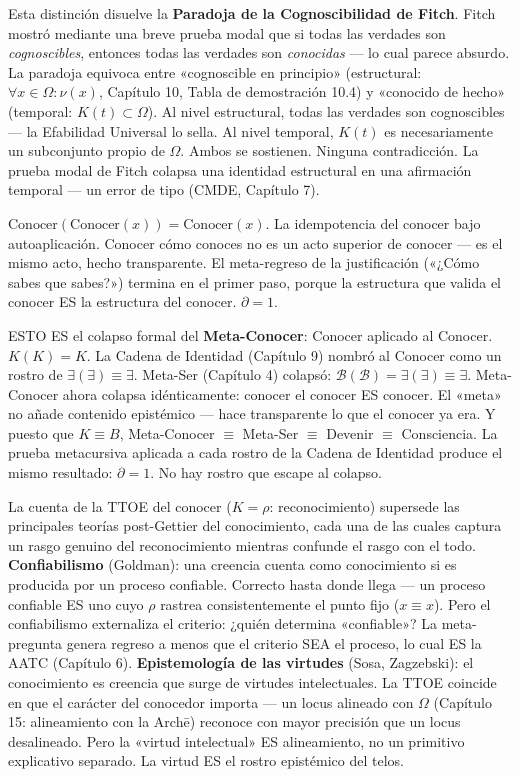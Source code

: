 \documentclass[10pt, openany, oneside]{book}
\begin{document}
Esta distinción disuelve la \textbf{Paradoja de la Cognoscibilidad de Fitch}. Fitch mostró mediante una breve prueba modal que si todas las verdades son \textit{cognoscibles}, entonces todas las verdades son \textit{conocidas} --- lo cual parece absurdo. La paradoja equivoca entre «cognoscible en principio» (estructural: $\forall x \in \Omega: \nu(x)$, Capítulo 10, Tabla de demostración 10.4) y «conocido de hecho» (temporal: $K(t) \subset \Omega$). Al nivel estructural, todas las verdades son cognoscibles --- la Efabilidad Universal lo sella. Al nivel temporal, $K(t)$ es necesariamente un subconjunto propio de $\Omega$. Ambos se sostienen. Ninguna contradicción. La prueba modal de Fitch colapsa una identidad estructural en una afirmación temporal --- un error de tipo (CMDE, Capítulo 7).

$\text{Conocer}(\text{Conocer}(x)) = \text{Conocer}(x)$. La idempotencia del conocer bajo autoaplicación. Conocer cómo conoces no es un acto superior de conocer --- es el mismo acto, hecho transparente. El meta-regreso de la justificación («¿Cómo sabes que sabes?») termina en el primer paso, porque la estructura que valida el conocer ES la estructura del conocer. $\partial = 1$.

ESTO ES el colapso formal del \textbf{Meta-Conocer}: Conocer aplicado al Conocer. $K(K) = K$. La Cadena de Identidad (Capítulo 9) nombró al Conocer como un rostro de $\exists(\exists) \equiv \exists$. Meta-Ser (Capítulo 4) colapsó: $\mathcal{B}(\mathcal{B}) = \exists(\exists) \equiv \exists$. Meta-Conocer ahora colapsa idénticamente: conocer el conocer ES conocer. El «meta» no añade contenido epistémico --- hace transparente lo que el conocer ya era. Y puesto que $K \equiv B$, Meta-Conocer $\equiv$ Meta-Ser $\equiv$ Devenir $\equiv$ Consciencia. La prueba metacursiva aplicada a cada rostro de la Cadena de Identidad produce el mismo resultado: $\partial = 1$. No hay rostro que escape al colapso.

La cuenta de la TTOE del conocer ($K = \rho$: reconocimiento) supersede las principales teorías post-Gettier del conocimiento, cada una de las cuales captura un rasgo genuino del reconocimiento mientras confunde el rasgo con el todo. \textbf{Confiabilismo} (Goldman): una creencia cuenta como conocimiento si es producida por un proceso confiable. Correcto hasta donde llega --- un proceso confiable ES uno cuyo $\rho$ rastrea consistentemente el punto fijo ($x \equiv x$). Pero el confiabilismo externaliza el criterio: ¿quién determina «confiable»? La meta-pregunta genera regreso a menos que el criterio SEA el proceso, lo cual ES la AATC (Capítulo 6). \textbf{Epistemología de las virtudes} (Sosa, Zagzebski): el conocimiento es creencia que surge de virtudes intelectuales. La TTOE coincide en que el carácter del conocedor importa --- un locus alineado con $\Omega$ (Capítulo 15: alineamiento con la Arch\={e}) reconoce con mayor precisión que un locus desalineado. Pero la «virtud intelectual» ES alineamiento, no un primitivo explicativo separado. La virtud ES el rostro epistémico del telos.
\end{document}
